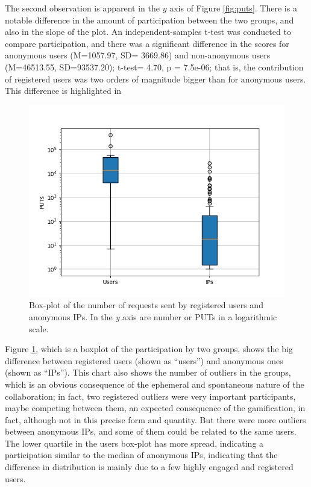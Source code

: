 \documentclass{llncs}
\begin{document}
The second observation is apparent in the $y$ axis of Figure
\ref{fig:puts}. There is a notable difference in the amount of
participation between the two groups, and also in the slope of the
plot.  An independent-samples t-test was conducted to compare
participation, and there was a significant difference in the scores
for anonymous users  (M=1057.97, SD= 3669.86) and non-anonymous users
(M=46513.55, SD=93537.20); t-test= 4.70, p = 7.5e-06; that is, the
contribution of registered users was two orders of magnitude bigger
than for anonymous users. This difference is highlighted in
%
%
%
%
%
\begin{figure}[htb]
    \centering
        \includegraphics[width=5in]{img/puts_box.png}
    \caption{Box-plot of the number of requests sent by registered users and anonymous IPs.
     In the \emph{y} axis are number or PUTs in a logarithmic scale.
    }
    \label{fig:box}
\end{figure}
%
 Figure \ref{fig:box}, which is a boxplot of the  participation by two
 groups, shows the big difference between registered users (shown as
 ``users'') and anonymous ones (shown as ``IPs''). This chart also
 shows the number of outliers in the groups, which is an obvious
 consequence of the ephemeral and spontaneous nature of the
 collaboration; in fact, two registered
outliers were very important participants, maybe competing between
them, an expected consequence of the gamification, in fact, although
not in this precise form and quantity. But
there were more outliers between anonymous IPs, and some of them could
be related to the same users. The lower quartile in the users box-plot
has more
spread, indicating a participation similar to the median of anonymous
IPs, indicating that the difference in distribution is mainly due to a
few highly engaged and registered users.
\end{document}
